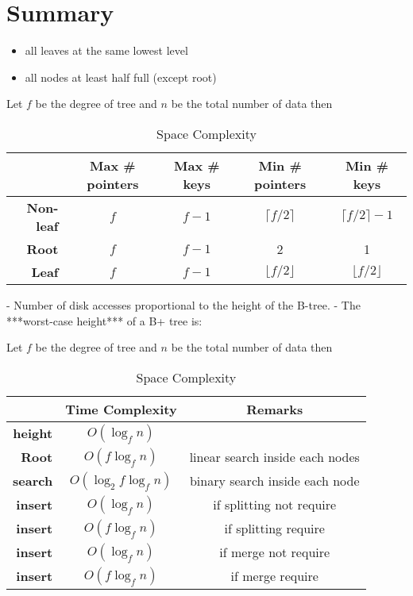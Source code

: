\documentclass[paper=letter, fontsize=12pt]{article}
\begin{document}
\section{Summary}
\begin{itemize}
	\item all leaves at the same lowest level
	\item all nodes at least half full (except root)
\end{itemize}

\begin{table}[H]
	Let $f$ be the degree of tree and $n$ be the total number of data then
	\centering
	\caption*{Space Complexity}
	\begin{tabular}{r | c | c | c | c}
		& \textbf{Max \# pointers} & \textbf{Max \# keys} & \textbf{Min \# pointers} & \textbf{Min \# keys} \\
		\hline
		\hline
		\textbf{Non-leaf} & $f$ & $f - 1$ & $\lceil f/2 \rceil$ & $\lceil f/2 \rceil - 1$ \\
		\textbf{Root} & $f$ & $f - 1$ & 2 & 1 \\
		\textbf{Leaf} & $f$ & $f - 1$ & $\lfloor f/2 \rfloor$ & $\lfloor f/2 \rfloor$ \\
	\end{tabular}
\end{table}


- Number of disk accesses proportional to the height of the B-tree.
- The ***worst-case height*** of a B+ tree is:

\begin{table}[H]
	Let $f$ be the degree of tree and $n$ be the total number of data then
	\centering
	\caption*{Space Complexity}
	\begin{tabular}{r | c | c }
		& \textbf{Time Complexity} & \textbf{Remarks} \\
		\hline
		\hline
		\textbf{height} & $O(\log_fn)$ & \\
		\textbf{Root} & $O(f\log_fn)$ & linear search inside each nodes \\
		\textbf{search} & $O(\log_2f\log_fn)$  & binary search inside each node \\
		\textbf{insert} & $O(\log_fn)$ & if splitting not require \\
		\textbf{insert} & $O(f\log_fn)$  & if splitting require \\
		\textbf{insert} &  $O(\log_fn)$  & if merge not require  \\
		\textbf{insert} &  $O(f\log_fn)$  & if merge require \\
	\end{tabular}
\end{table}
\end{document}
